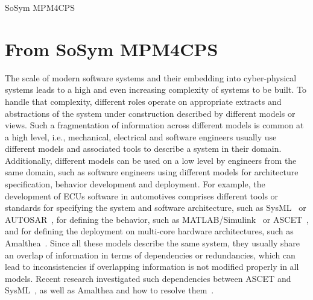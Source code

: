 \begin{copiedFrom}{SoSym MPM4CPS}

\section{From SoSym MPM4CPS}

The scale of modern software systems and their embedding into cyber-physical systems leads to a high and even increasing complexity of systems to be built. 
To handle that complexity, different roles operate on appropriate extracts and abstractions of the system under construction described by different models or views.
Such a fragmentation of information across different models is common at a high level, i.e., mechanical, electrical and software engineers usually use different models and associated tools to describe a system in their domain.
Additionally, different models can be used on a low level by engineers from the same domain, such as software engineers using different models for architecture specification, behavior development and deployment.
For example, the development of \acp{ECU} software in automotives comprises different tools or standards for specifying the system and software architecture, such as SysML~\cite{sysml} or AUTOSAR~\cite{scheid2015autosar}, for defining the behavior, such as MATLAB/Simulink~\cite{simulink} or ASCET~\cite{ascet}, and for defining the deployment on multi-core hardware architectures, such as Amalthea~\cite{amalthea, wolff2014a}.
Since all these models describe the same system, they usually share an overlap of information in terms of dependencies or redundancies, which can lead to inconsistencies if overlapping information is not modified properly in all models.
Recent research investigated such dependencies between ASCET and SysML~\cite{giese2010a}, as well as Amalthea and how to resolve them~\cite{mazkatli2017ase,mazkatli2016ma}.


\end{copiedFrom}
